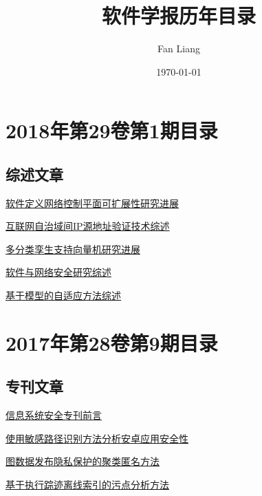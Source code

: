 \documentclass[a4paper]{article}
\begin{document}
\title{软件学报历年目录}
\author{Fan Liang}
\date{\today}
\maketitle


\section{\textbf{2018年第29卷第1期目录}}
\subsection{综述文章}
\href{http://www.jos.org.cn/ch/reader/create_pdf.aspx?file_no=5316&year_id=2018&quarter_id=1&falg=1}{软件定义网络控制平面可扩展性研究进展}

\href{http://www.jos.org.cn/ch/reader/create_pdf.aspx?file_no=5318&year_id=2018&quarter_id=1&falg=1}{互联网自治域间IP源地址验证技术综述}

\href{http://www.jos.org.cn/ch/reader/create_pdf.aspx?file_no=5319&year_id=2018&quarter_id=1&falg=1}{多分类孪生支持向量机研究进展}

\href{http://www.jos.org.cn/ch/reader/create_pdf.aspx?file_no=5320&year_id=2018&quarter_id=1&falg=1}{软件与网络安全研究综述}

\href{http://www.jos.org.cn/ch/reader/create_pdf.aspx?file_no=5323&year_id=2018&quarter_id=1&falg=1}{基于模型的自适应方法综述}


\section{\textbf{2017年第28卷第9期目录}}
\subsection{专刊文章}
\href{http://www.jos.org.cn/ch/reader/create_pdf.aspx?file_no=5188&year_id=2017&quarter_id=9&falg=1}{信息系统安全专刊前言}

\href{http://www.jos.org.cn/ch/reader/create_pdf.aspx?file_no=5177&year_id=2017&quarter_id=9&falg=1}{使用敏感路径识别方法分析安卓应用安全性}

\href{http://www.jos.org.cn/ch/reader/create_pdf.aspx?file_no=5178&year_id=2017&quarter_id=9&falg=1}{图数据发布隐私保护的聚类匿名方法}

\href{http://www.jos.org.cn/ch/reader/create_pdf.aspx?file_no=5179&year_id=2017&quarter_id=9&falg=1}{基于执行踪迹离线索引的污点分析方法}
\end{document}
